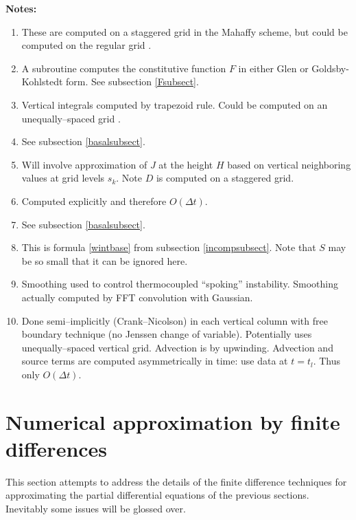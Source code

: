 \documentclass{amsart}%
\theoremstyle{plain}
\theoremstyle{definition}
\theoremstyle{remark}
\begin{document}
\medskip
\noindent\textbf{Notes:}
\begin{enumerate}
\item\label{stagnote}  These are computed on a staggered grid in the Mahaffy \cite{Mahaffy} scheme, but could be computed on the regular grid \cite{HindmarshPayne}.
\item\label{Fnote} A subroutine computes the constitutive function $F$ in either Glen or Goldsby-Kohlstedt form.  See subsection \ref{Fsubsect}.
\item\label{vertintnote} Vertical integrals computed by trapezoid rule.  Could be computed on an unequally--spaced grid \cite{PayneDongelmans}.
\item\label{basalnote} See subsection \ref{basalsubsect}.
\item\label{interpnote} Will involve approximation of $J$ at the height $H$ based on vertical neighboring values at grid levels $s_k$.  Note $D$ is computed on a staggered grid.
\item\label{hfirstnote} Computed explicitly and therefore $O(\Delta t)$.
\item\label{Snote} See subsection \ref{basalsubsect}.
\item\label{wbasenote} This is formula \eqref{wintbase} from subsection \ref{incompsubsect}.  Note that $S$ may be so small that it can be ignored here.
\item\label{smoothnote} Smoothing used to control thermocoupled ``spoking'' instability.  Smoothing actually computed by FFT convolution with Gaussian.
\item\label{Tnote} Done semi--implicitly (Crank--Nicolson) in each vertical column with free boundary technique (no Jenssen change of variable).  Potentially uses unequally--spaced vertical grid.  Advection is by upwinding.  Advection and source terms are computed asymmetrically in time: use data at $t=t_l$.  Thus only $O(\Delta t)$.
\end{enumerate}


\section{Numerical approximation by finite differences}\label{numsect}

This section attempts to address the details of the finite difference techniques for approximating the partial differential equations of the previous sections.  Inevitably some issues will be glossed over.
\end{document}
